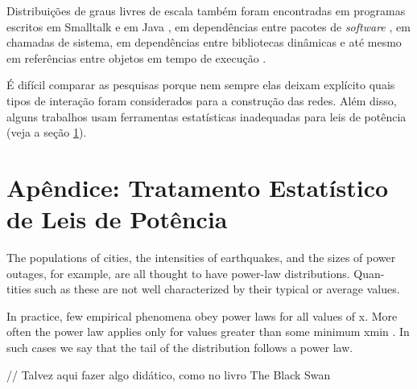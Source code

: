 \documentclass{article}
\begin{document}
Distribuições de graus livres de escala também foram encontradas em programas escritos em Smalltalk \cite{Marchesi2004,Concas2007} e em Java \cite{Hyland-Wood2006,Baxter2006,Ichii2008}, em dependências entre pacotes de \textit{software} \cite{Labelle2004}, em chamadas de sistema, em dependências entre bibliotecas dinâmicas \cite{Louridas2008} e até mesmo em referências entre objetos em tempo de execução \cite{Potanin2005}.

É difícil comparar as pesquisas porque nem sempre elas deixam explícito quais tipos de interação foram considerados para a construção das redes. Além disso, alguns trabalhos usam ferramentas estatísticas inadequadas para leis de potência (veja a seção \ref{sec:estatistica}).


\section{Apêndice: Tratamento Estatístico de Leis de Potência} \label{sec:estatistica}


              The populations of cities, the intensities of earthquakes, and the sizes of
power outages, for example, are all thought to have power-law distributions. Quan-
tities such as these are not well characterized by their typical or average values.

    In practice, few empirical phenomena obey power laws for all values of x. More
often the power law applies only for values greater than some minimum xmin . In such
cases we say that the tail of the distribution follows a power law.


// Talvez aqui fazer algo didático, como no livro The Black Swan
\end{document}
